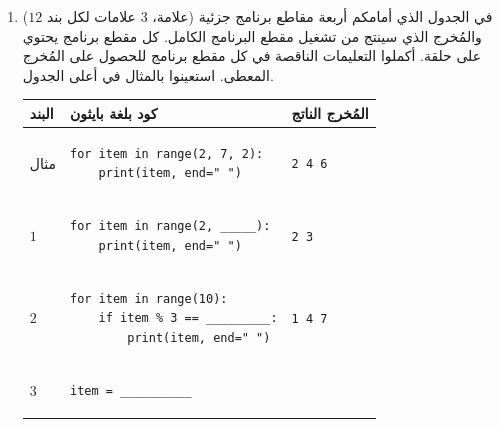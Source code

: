 \documentclass[14pt]{extarticle}
\begin{document}
\begin{enumerate}[label=\textbf{السؤال \arabic*:}, wide=0pt, itemsep=2.2em]
\item ($12$ علامة، $3$ علامات لكل بند) في الجدول الذي أمامكم أربعة مقاطع برنامج جزئية والمُخرج الذي سينتج من تشغيل مقطع البرنامج الكامل. كل مقطع برنامج يحتوي على حلقة.
أكملوا التعليمات الناقصة في كل مقطع برنامج للحصول على المُخرج المعطى. استعينوا بالمثال في أعلى الجدول.

{\renewcommand{\arraystretch}{1.4}
\begin{longtable}{|C{1.5cm}|p{9cm}|C{4cm}|}
\hline
\textbf{البند} & \centering\textbf{كود بلغة بايثون} & \textbf{المُخرج الناتج} \\
\hline
مثال &
\begin{pycell}
\begin{english}
\begin{verbatim}
for item in range(2, 7, 2):
    print(item, end=" ")
\end{verbatim}
\end{english}
\end{pycell}
& \begin{english}\texttt{2 4 6}\end{english} \\
\hline
$1$ &
\begin{pycell}
\begin{english}
\begin{verbatim}
for item in range(2, _____):
    print(item, end=" ")
\end{verbatim}
\end{english}
\end{pycell}
& \begin{english}\texttt{2 3}\end{english} \\
\hline
$2$ &
\begin{pycell}
\begin{english}
\begin{verbatim}
for item in range(10):
    if item % 3 == _________:
        print(item, end=" ")
\end{verbatim}
\end{english}
\end{pycell}
& \begin{english}\texttt{1 4 7}\end{english} \\
\hline
$3$ &
\begin{pycell}
\begin{english}
\begin{verbatim}
item = __________

\end{verbatim}
\end{english}
\end{pycell}
\end{longtable}}
\end{enumerate}
\end{document}
